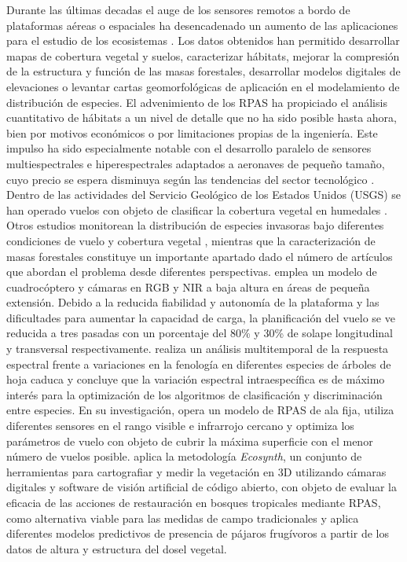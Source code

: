 \documentclass[twocolumn]{extarticle}
\begin{document}
Durante las últimas decadas el auge de los sensores remotos a bordo de
plataformas aéreas o espaciales ha desencadenado un aumento de las
aplicaciones para el estudio de los ecosistemas \citep{Wulder2004}. Los
datos obtenidos han permitido desarrollar mapas de cobertura vegetal y
suelos, caracterizar hábitats, mejorar la compresión de la estructura y
función de las masas forestales, desarrollar modelos digitales de
elevaciones o levantar cartas geomorfológicas de aplicación en el
modelamiento de distribución de especies. El advenimiento de los RPAS ha
propiciado el análisis cuantitativo de hábitats a un nivel de detalle
que no ha sido posible hasta ahora, bien por motivos económicos o por
limitaciones propias de la ingeniería. Este impulso ha sido
especialmente notable con el desarrollo paralelo de sensores
multiespectrales e hiperespectrales adaptados a aeronaves de pequeño
tamaño, cuyo precio se espera disminuya según las tendencias del sector
tecnológico . Dentro de las actividades del Servicio Geológico de los
Estados Unidos (USGS) se han operado vuelos con objeto de clasificar la
cobertura vegetal en humedales \citep{USGS2014}. Otros estudios
monitorean la distribución de especies invasoras bajo diferentes
condiciones de vuelo y cobertura vegetal \citep{Perroy2017}, mientras
que la caracterización de masas forestales constituye un importante
apartado dado el número de artículos que abordan el problema desde
diferentes perspectivas. \citep{Gini2012} emplea un modelo de
cuadrocóptero y cámaras en RGB y NIR a baja altura en áreas de pequeña
extensión. Debido a la reducida fiabilidad y autonomía de la plataforma
y las dificultades para aumentar la capacidad de carga, la planificación
del vuelo se ve reducida a tres pasadas con un porcentaje del 80\% y
30\% de solape longitudinal y transversal
respectivamente.\citep{Lisein2015} realiza un análisis multitemporal de
la respuesta espectral frente a variaciones en la fenología en
diferentes especies de árboles de hoja caduca y concluye que la
variación espectral intraespecífica es de máximo interés para la
optimización de los algoritmos de clasificación y discriminación entre
especies. En su investigación, opera un modelo de RPAS de ala fija,
utiliza diferentes sensores en el rango visible e infrarrojo cercano y
optimiza los parámetros de vuelo con objeto de cubrir la máxima
superficie con el menor número de vuelos posible. \citep{Zahawi2015}
aplica la metodología \emph{Ecosynth}, un conjunto de herramientas para
cartografiar y medir la vegetación en 3D utilizando cámaras digitales y
software de visión artificial de código abierto, con objeto de evaluar
la eficacia de las acciones de restauración en bosques tropicales
mediante RPAS, como alternativa viable para las medidas de campo
tradicionales y aplica diferentes modelos predictivos de presencia de
pájaros frugívoros a partir de los datos de altura y estructura del
dosel vegetal.
\end{document}
